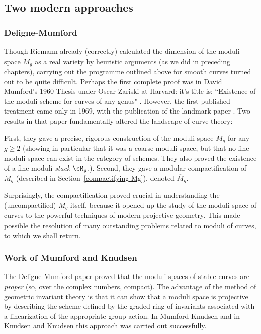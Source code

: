 \subsection{Two modern approaches}

\subsubsection{Deligne-Mumford}Though Riemann already (correctly) calculated the dimension of the moduli space $M_g$ as a real variety by heuristic arguments (as we did in preceding chapters), carrying out the programme outlined above for smooth curves turned out to be quite difficult. 
Perhaps the first complete proof was in David Mumford's 1960 Thesis under Oscar Zariski at Harvard: it's title is:
``Existence of the moduli scheme for curves of any genus" \cite{}. However, the first published treatment came only in 1969, with the publication of the landmark paper \cite{Deligne-Mumford}. Two results in that paper fundamentally altered the landscape of curve theory:

First, they gave a precise, rigorous construction of the moduli space $M_g$ for any $g \geq 2$ (showing in particular that it was a coarse moduli space, but that no fine moduli space can exist in the category of schemes. They also proved the existence of a fine moduli \emph{ stack} $\cM_g$.). Second, they gave a modular compactification of $M_g$ (described in Section~\ref{compactifying Mg}), denoted $\overline M_g$. 

Surprisingly, the compactification proved crucial in understanding the (uncompactified) $M_g$ itself, because it opened up the study of the moduli space of curves to the powerful techniques of modern projective geometry. This made possible the resolution of many outstanding problems related to moduli of curves, to which we shall return. 

\subsubsection{Work of Mumford and Knudsen} The Deligne-Mumford paper proved that the
moduli spaces of stable curves are \emph{proper} (so, over the complex numbers, compact). The advantage of the method of geometric invariant theory is that it can show that a moduli space is projective by describing the scheme defined by
the graded ring of invariants associated with a linearization of the appropriate group action. In
Mumford-Knudsen and in Knudsen and Knudsen  this approach 
was carried out successfully.

